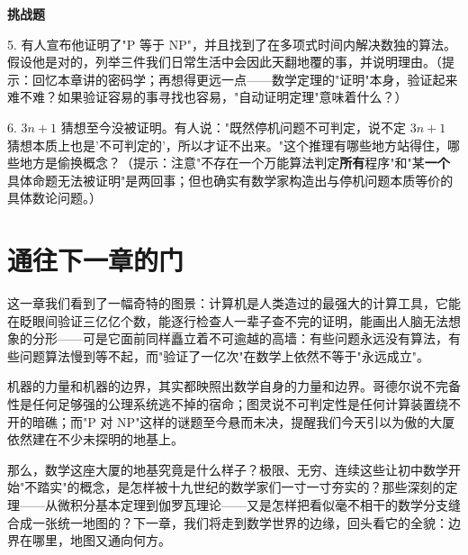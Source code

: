 \textbf{挑战题}

5. 有人宣布他证明了"P 等于 NP"，并且找到了在多项式时间内解决数独的算法。假设他是对的，列举三件我们日常生活中会因此天翻地覆的事，并说明理由。（提示：回忆本章讲的密码学；再想得更远一点——数学定理的"证明"本身，验证起来难不难？如果验证容易的事寻找也容易，"自动证明定理"意味着什么？）

6. $3n+1$ 猜想至今没被证明。有人说："既然停机问题不可判定，说不定 $3n+1$ 猜想本质上也是'不可判定的'，所以才证不出来。"这个推理有哪些地方站得住，哪些地方是偷换概念？（提示：注意"不存在一个万能算法判定\textbf{所有}程序"和"某\textbf{一个}具体命题无法被证明"是两回事；但也确实有数学家构造出与停机问题本质等价的具体数论问题。）

\section*{通往下一章的门}

这一章我们看到了一幅奇特的图景：计算机是人类造过的最强大的计算工具，它能在眨眼间验证三亿亿个数，能逐行检查人一辈子查不完的证明，能画出人脑无法想象的分形——可是它面前同样矗立着不可逾越的高墙：有些问题永远没有算法，有些问题算法慢到等不起，而"验证了一亿次"在数学上依然不等于"永远成立"。

机器的力量和机器的边界，其实都映照出数学自身的力量和边界。哥德尔说不完备性是任何足够强的公理系统逃不掉的宿命；图灵说不可判定性是任何计算装置绕不开的暗礁；而"P 对 NP"这样的谜题至今悬而未决，提醒我们今天引以为傲的大厦依然建在不少未探明的地基上。

那么，数学这座大厦的地基究竟是什么样子？极限、无穷、连续这些让初中数学开始"不踏实"的概念，是怎样被十九世纪的数学家们一寸一寸夯实的？那些深刻的定理——从微积分基本定理到伽罗瓦理论——又是怎样把看似毫不相干的数学分支缝合成一张统一地图的？下一章，我们将走到数学世界的边缘，回头看它的全貌：边界在哪里，地图又通向何方。
